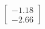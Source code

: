 \documentclass[preview]{standalone}
\begin{document}
\begin{align*}
\begin{bmatrix} -1.18 \\ -2.66 \end{bmatrix}
\end{align*}
\end{document}
